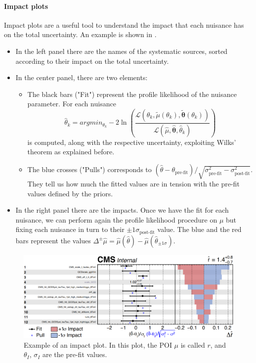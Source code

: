 \paragraph*{Impact plots} Impact plots are a useful tool to understand the impact that each nuisance has on the total uncertainty. An example is shown in .\\
\begin{itemize}
    \item In the left panel there are the names of the systematic sources, sorted according to their impact on the total uncertainty.
    \newpage
    \item In the center panel, there are two elements:
    \begin{itemize}
        \item[\ding{226}] The black bars ("Fit") represent the profile likelihood of the nuisance parameter. For each nuisance
        \begin{equation}
             \hat{\theta}_k=argmin_{\theta_k} -2 \ln \left( \frac{\mathcal{L}(\theta_k, \tilde{\mu}(\theta_k),\bm{\tilde{\theta}}(\theta_k))}{\mathcal{L}(\hat{\mu},\bm{\hat{\theta}},\hat{\theta}_k)} \right)
        \end{equation}
        is computed, along with the respective uncertainty, exploiting Wilks' theorem as explained before.
        \item[\ding{226}] The blue crosses ("Pulls") corresponds to $(\hat{\theta}-\theta_{\text{pre-fit}})/\sqrt{\sigma_{\text{pre-fit}}^2-\sigma_{\text{post-fit}}^2}$.\\
        They tell us how much the fitted values are in tension with the pre-fit values defined by the priors.      
    \end{itemize}
    \item In the right panel there are the impacts.
    Once we have the fit for each nuisance, we can perform again the profile likelihood procedure on $\mu$ but fixing each nuisance in turn to their $\pm 1 \sigma_{\text{post-fit}}$ value. The blue and the red bars represent the values $\Delta^{\pm} \hat{\mu}=\hat{\mu}(\hat{\theta})-\hat{\mu}(\hat{\theta}_{\pm 1 \sigma})$.    
\end{itemize}
\begin{figure}[h!]
    \centering
    \includegraphics[width=1\linewidth]{fig/chap05-stats/impact.png}
    \caption{Example of an impact plot. In this plot, the POI $\mu$ is called $r$, and $\theta_I$, $\sigma_I$ are the pre-fit values.}
    \label{fig:impact}
\end{figure}



